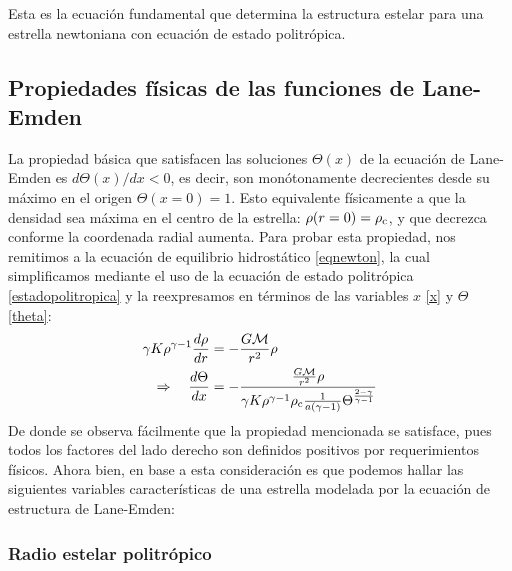 Esta es la ecuación fundamental que determina la estructura estelar para una estrella newtoniana con ecuación de estado politrópica.



\subsection{Propiedades físicas de las funciones de Lane-Emden}

La propiedad básica que satisfacen las soluciones $\Theta(x)$ de la ecuación de Lane-Emden es $d\Theta(x)/dx<0$, es decir, son monótonamente decrecientes desde su máximo en el origen $\Theta(x=0)=1$. Esto equivalente físicamente a que la densidad sea máxima en el centro de la estrella: $\rho(r=0)=\rho_{\rm c}$, y que decrezca conforme la coordenada radial aumenta. Para probar esta propiedad, nos remitimos a la ecuación de equilibrio hidrostático \eqref{eqnewton}, la cual simplificamos mediante el uso de la ecuación de estado politrópica \eqref{estadopolitropica} y la reexpresamos en términos de las variables $x$ \eqref{x} y $\Theta$ \eqref{theta}:
\begin{align}
\gamma K\rho^{\gamma-1}\frac{d\rho}{dr}&=-\frac{G\mathcal{M}}{r^2}\rho\\
\Rightarrow\quad \frac{d\Theta}{dx}&=-\frac{\frac{G\mathcal{M}}{r^2}\rho}{\gamma K \rho^{\gamma-1}\rho_{\rm c}\frac{1}{a(\gamma-1)}\Theta^{\frac{2-\gamma}{\gamma-1}}}\label{theta-decreciente}
\end{align}
De donde se observa fácilmente que la propiedad mencionada se satisface, pues todos los factores del lado derecho son definidos positivos por requerimientos físicos. Ahora bien, en base a esta consideración es que podemos hallar las siguientes variables características de una estrella modelada por la ecuación de estructura de Lane-Emden:

\subsubsection{Radio estelar politrópico}


